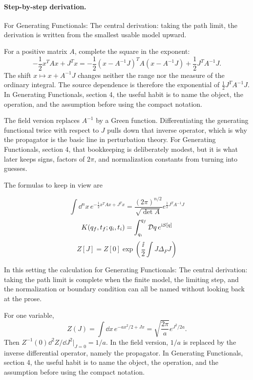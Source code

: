 \paragraph{Step-by-step derivation.}

For Generating Functionals: The central derivation: taking the path limit, the derivation is written from the smallest usable model upward.

For a positive matrix \(A\), complete the square in the exponent:
\[
  -\frac12x^TAx+J^Tx
  =
  -\frac12(x-A^{-1}J)^TA(x-A^{-1}J)
  +\frac12J^TA^{-1}J.
\]
The shift \(x\mapsto x+A^{-1}J\) changes neither the range nor the measure of the ordinary integral.  The source dependence is therefore the exponential of \(\frac12J^TA^{-1}J\).  In Generating Functionals, section 4, the useful habit is to name the object, the operation, and the assumption before using the compact notation.

The field version replaces \(A^{-1}\) by a Green function.  Differentiating the generating functional twice with respect to \(J\) pulls down that inverse operator, which is why the propagator is the basic line in perturbation theory.  For Generating Functionals, section 4, that bookkeeping is deliberately modest, but it is what later keeps signs, factors of \(2\pi\), and normalization constants from turning into guesses.

The formulas to keep in view are

\[
  \int\dd^n x\,e^{-\frac12x^TAx+J^Tx}=\frac{(2\pi)^{n/2}}{\sqrt{\det A}}e^{\frac12J^TA^{-1}J}
\]
\[
  K(q_f,t_f;q_i,t_i)=\int_{q_i}^{q_f}\mathcal D q\,e^{\mathrm i S[q]}
\]
\[
  Z[J]=Z[0]\exp\left(\frac{\ii}{2}\int J\Delta_FJ\right)
\]

In this setting the calculation for Generating Functionals: The central derivation: taking the path limit is complete when the finite model, the limiting step, and the normalization or boundary condition can all be named without looking back at the prose.




\begin{example}
For one variable,
\[
  Z(J)=\int\dd x\,e^{-ax^2/2+Jx}
  =\sqrt{\frac{2\pi}{a}}e^{J^2/2a}.
\]
Then \(Z^{-1}(0)\dd^2Z/\dd J^2|_{J=0}=1/a\).  In the field version, \(1/a\) is replaced by the inverse differential operator, namely the propagator.  In Generating Functionals, section 4, the useful habit is to name the object, the operation, and the assumption before using the compact notation.
\end{example}



